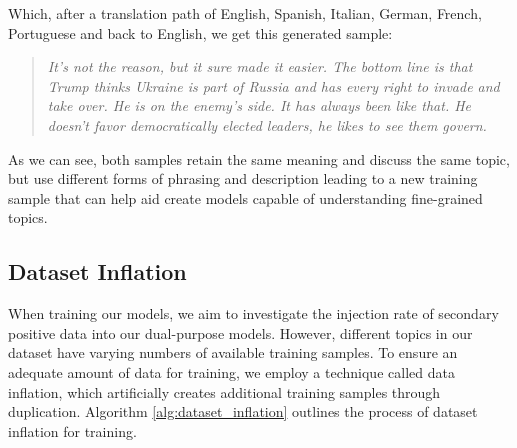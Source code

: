 Which, after a translation path of English, Spanish, Italian, German, French, Portuguese and back to English, we get this generated sample:

\begin{quote}
    \textit{It's not the reason, but it sure made it easier. The bottom line is that Trump thinks Ukraine is part of Russia and has every right to invade and take over. He is on the enemy's side. It has always been like that. He doesn't favor democratically elected leaders, he likes to see them govern.}
\end{quote}

As we can see, both samples retain the same meaning and discuss the same topic, but use different forms of phrasing and description leading to a new training sample that can help aid create models capable of understanding fine-grained topics.

\begin{table}[ht]
    \caption{Number of original, new and total samples of training data after performing data augmentation. Augmentation rate is the number of new samples per original sample}
    \label{tab:data_aug_results}
\end{table}

\subsection{Dataset Inflation}
\label{dataset_inflation}

When training our models, we aim to investigate the injection rate of secondary positive data into our dual-purpose models. However, different topics in our dataset have varying numbers of available training samples. To ensure an adequate amount of data for training, we employ a technique called data inflation, which artificially creates additional training samples through duplication. Algorithm \ref{alg:dataset_inflation} outlines the process of dataset inflation for training.

